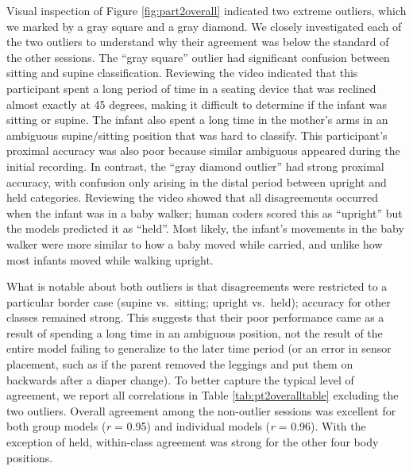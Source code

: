 \documentclass[
  man]{apa6}
\begin{document}
Visual inspection of Figure \ref{fig:part2overall} indicated two extreme outliers, which we marked by a gray square and a gray diamond. We closely investigated each of the two outliers to understand why their agreement was below the standard of the other sessions. The ``gray square'' outlier had significant confusion between sitting and supine classification. Reviewing the video indicated that this participant spent a long period of time in a seating device that was reclined almost exactly at 45 degrees, making it difficult to determine if the infant was sitting or supine. The infant also spent a long time in the mother's arms in an ambiguous supine/sitting position that was hard to classify. This participant's proximal accuracy was also poor because similar ambiguous appeared during the initial recording. In contrast, the ``gray diamond outlier'' had strong proximal accuracy, with confusion only arising in the distal period between upright and held categories. Reviewing the video showed that all disagreements occurred when the infant was in a baby walker; human coders scored this as ``upright'' but the models predicted it as ``held''. Most likely, the infant's movements in the baby walker were more similar to how a baby moved while carried, and unlike how most infants moved while walking upright.

What is notable about both outliers is that disagreements were restricted to a particular border case (supine vs.~sitting; upright vs.~held); accuracy for other classes remained strong. This suggests that their poor performance came as a result of spending a long time in an ambiguous position, not the result of the entire model failing to generalize to the later time period (or an error in sensor placement, such as if the parent removed the leggings and put them on backwards after a diaper change). To better capture the typical level of agreement, we report all correlations in Table \ref{tab:pt2overalltable} excluding the two outliers. Overall agreement among the non-outlier sessions was excellent for both group models (\emph{r} = 0.95) and individual models (\emph{r} = 0.96). With the exception of held, within-class agreement was strong for the other four body positions.
\end{document}
